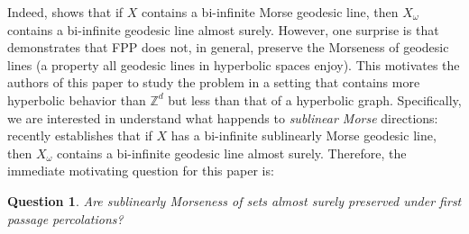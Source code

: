 \documentclass[12 pt]{amsart}
\newcommand{\ZZ}{\mathbb{Z}}
\newtheorem{question}[theorem]{Question}
\theoremstyle{definition}
\theoremstyle{remark}
\begin{document}
Indeed, \cite{BT17} shows that if $X$ contains a bi-infinite Morse geodesic line, then $X_\omega$ contains a bi-infinite geodesic line almost surely. However, one surprise is that  \cite{BJQ} demonstrates that FPP does not, in general, preserve the Morseness of geodesic lines (a property all geodesic lines in hyperbolic spaces enjoy). This motivates the authors of this paper to study the problem in a setting that contains more hyperbolic behavior than $\ZZ^d$ but less than that of a hyperbolic graph. Specifically, we are interested in understand what happends to \emph{sublinear Morse} directions: recently \cite{JanaQing1} establishes that if $X$ has a bi-infinite sublinearly Morse geodesic line, then $X_\omega$ contains a bi-infinite geodesic line almost surely. Therefore, the immediate motivating question for this paper is:
\begin{question}
Are sublinearly Morseness of sets almost surely preserved under first  passage percolations? 
\end{question}




\end{document}
